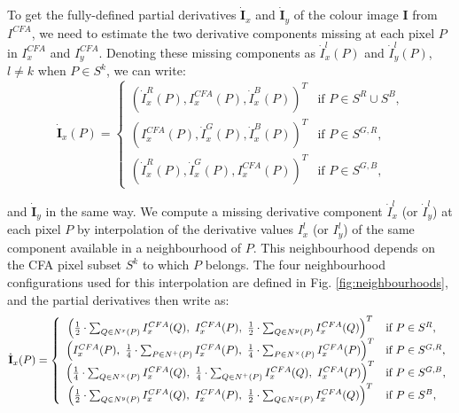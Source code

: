 \documentclass[twoside]{article}
\newcommand\point{\stackrel{.}}
\begin{document}
To get the fully-defined partial derivatives $\dot{\textbf{I}}_x$ and $\dot{\textbf{I}}_y$ of the colour image $\mathbf{I}$ from $I^{CFA}$, we need to estimate the two derivative components missing at each pixel $P$ in $I^{CFA}_x$ and $I^{CFA}_y$. Denoting these missing components as $\dot{I}_x^l(P)$ and $\dot{I}_y^l(P)$, $l \neq k$ when $P \in S^k$, we can write:
\begin{equation}
	\dot{\textbf{I}}_x(P) = \left\lbrace
	\begin{array}{cl}
		\left( \dot{I}^R_x(P), I^{CFA}_x(P), \dot{I}^B_x(P) \right)^T & \text{if $P \in S^R \cup S^B$,}\\
		\left( I^{CFA}_x(P), \dot{I}^G_x(P), \dot{I}^B_x(P) \right)^T & \text{if $P \in S^{G,R}$,}\\
		\left( \dot{I}^R_x(P), \dot{I}^G_x(P), I^{CFA}_x(P) \right)^T & \text{if $P \in S^{G,B}$,}
	\end{array}\right.
	\label{eq:I_p_x}
\end{equation}

\noindent and $\dot{\textbf{I}}_y$ in the same way. We compute a missing derivative component $\dot{I}_{x}^l$ (or $\dot{I}_{y}^l$) at each pixel $P$ by interpolation of the derivative values $I_{x}^l$ (or $I_{y}^l$) of the same component available in a neighbourhood of $P$. This neighbourhood depends on the CFA pixel subset $S^k$ to which $P$ belongs. The four neighbourhood configurations used for this interpolation are defined in Fig. \ref{fig:neighbourhoods}, and the partial derivatives then write as:
\begin{equation}
	\dot{\textbf{I}}_x(P) = \left\lbrace
	\begin{array}{cl}
		\left( \frac{1}{2}\cdot\sum_{Q \in N^{x}(P)} I^{CFA}_x(Q),~I^{CFA}_x(P),~\frac{1}{2}\cdot\sum_{Q \in N^{y}(P)} I^{CFA}_x(Q) \right)^T & \text{if $P \in S^R$,} \\
		\left( I^{CFA}_x(P),~\frac{1}{4}\cdot\sum_{P \in N^{+}(P)} I^{CFA}_x(P),~\frac{1}{4}\cdot\sum_{P \in N^{\times}(P)} I^{CFA}_x(P) \right)^T & \text{if $P \in S^{G,R}$,}\\
		\left( \frac{1}{4}\cdot\sum_{Q \in N^{\times}(P)} I^{CFA}_x(Q),~\frac{1}{4}\cdot\sum_{Q \in N^{+}(P)} I^{CFA}_x(Q),~I^{CFA}_x(P) \right)^T & \text{if $P \in S^{G,B}$,}\\
		\left( \frac{1}{2}\cdot\sum_{Q \in N^{y}(P)} I^{CFA}_x(Q),~I^{CFA}_x(P),~\frac{1}{2}\cdot\sum_{Q \in N^{x}(P)} I^{CFA}_x(Q) \right)^T & \text{if $P \in S^B$,}
	\end{array}\right.
	\label{eq:I_p_x_full}
\end{equation}
\end{document}
